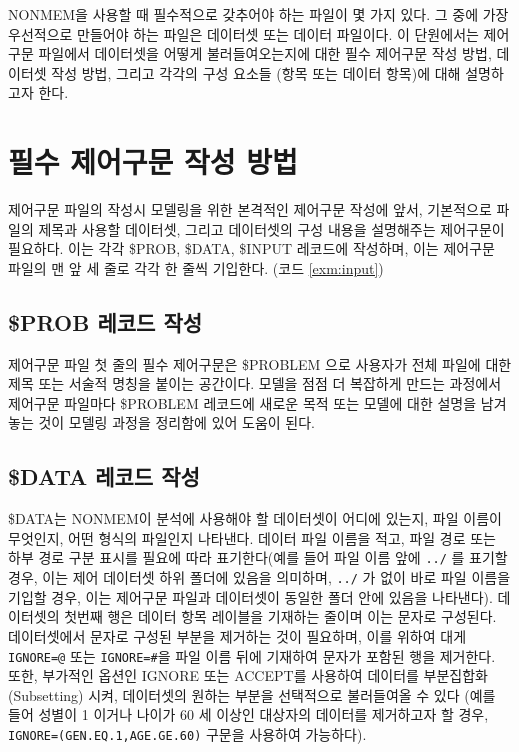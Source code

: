 \documentclass[
  11pt,
  krantz2, a4paper, twoside]{krantz}
\theoremstyle{definition}
\theoremstyle{definition}
\theoremstyle{definition}
\theoremstyle{remark}
\begin{document}
NONMEM을 사용할 때 필수적으로 갖추어야 하는 파일이 몇 가지 있다. 그 중에 가장 우선적으로 만들어야 하는 파일은 데이터셋 또는 데이터 파일이다. 이 단원에서는 제어구문 파일에서 데이터셋을 어떻게 불러들여오는지에 대한 필수 제어구문 작성 방법, 데이터셋 작성 방법, 그리고 각각의 구성 요소들 (항목 또는 데이터 항목)에 대해 설명하고자 한다.

\hypertarget{uxd544uxc218-uxc81cuxc5b4uxad6cuxbb38-uxc791uxc131-uxbc29uxbc95}{%
\section{필수 제어구문 작성 방법}\label{uxd544uxc218-uxc81cuxc5b4uxad6cuxbb38-uxc791uxc131-uxbc29uxbc95}}

제어구문 파일의 작성시 모델링을 위한 본격적인 제어구문 작성에 앞서, 기본적으로 파일의 제목과 사용할 데이터셋, 그리고 데이터셋의 구성 내용을 설명해주는 제어구문이 필요하다. 이는 각각 \$PROB, \$DATA, \$INPUT 레코드에 작성하며, 이는 제어구문 파일의 맨 앞 세 줄로 각각 한 줄씩 기입한다. (코드 \ref{exm:input})

\hypertarget{prob-uxb808uxcf54uxb4dc-uxc791uxc131}{%
\subsection{\$PROB 레코드 작성}\label{prob-uxb808uxcf54uxb4dc-uxc791uxc131}}

제어구문 파일 첫 줄의 필수 제어구문은 \$PROBLEM 으로 사용자가 전체 파일에 대한 제목 또는 서술적 명칭을 붙이는 공간이다. 모델을 점점 더 복잡하게 만드는 과정에서 제어구문 파일마다 \$PROBLEM 레코드에 새로운 목적 또는 모델에 대한 설명을 남겨놓는 것이 모델링 과정을 정리함에 있어 도움이 된다.

\hypertarget{data-uxb808uxcf54uxb4dc-uxc791uxc131}{%
\subsection{\$DATA 레코드 작성}\label{data-uxb808uxcf54uxb4dc-uxc791uxc131}}


\$DATA는 NONMEM이 분석에 사용해야 할 데이터셋이 어디에 있는지, 파일 이름이 무엇인지, 어떤 형식의 파일인지 나타낸다. 데이터 파일 이름을 적고, 파일 경로 또는 하부 경로 구분 표시를 필요에 따라 표기한다(예를 들어 파일 이름 앞에 \texttt{../} 를 표기할 경우, 이는 제어 데이터셋 하위 폴더에 있음을 의미하며, \texttt{../} 가 없이 바로 파일 이름을 기입할 경우, 이는 제어구문 파일과 데이터셋이 동일한 폴더 안에 있음을 나타낸다). 데이터셋의 첫번째 행은 데이터 항목 레이블을 기재하는 줄이며 이는 문자로 구성된다. 데이터셋에서 문자로 구성된 부분을 제거하는 것이 필요하며, 이를 위하여 대게 \texttt{IGNORE=@} 또는 \texttt{IGNORE=\#}을 파일 이름 뒤에 기재하여 문자가 포함된 행을 제거한다. 또한, 부가적인 옵션인 IGNORE 또는 ACCEPT를 사용하여 데이터를 부분집합화(Subsetting) 시켜, 데이터셋의 원하는 부분을 선택적으로 불러들여올 수 있다 (예를 들어 성별이 1 이거나 나이가 60 세 이상인 대상자의 데이터를 제거하고자 할 경우, \texttt{IGNORE=(GEN.EQ.1,AGE.GE.60)} 구문을 사용하여 가능하다).
\end{document}
